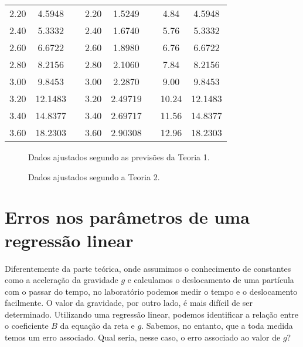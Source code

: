 \begin{table}
\begin{tabular}{cccccccc}
2.20    & 4.5948    &&  2.20    & 1.5249       &&   4.84     & 4.5948  \\
2.40    & 5.3332    &&  2.40    & 1.6740       &&   5.76     & 5.3332  \\
2.60    & 6.6722    &&  2.60    & 1.8980       &&   6.76     & 6.6722  \\
2.80    & 8.2156    &&  2.80    & 2.1060       &&   7.84     & 8.2156  \\
3.00    & 9.8453    &&  3.00    & 2.2870       &&   9.00     & 9.8453  \\
3.20    & 12.1483   &&  3.20    & 2.49719      &&   10.24    & 12.1483 \\
3.40    & 14.8377   &&  3.40    & 2.69717      &&   11.56    & 14.8377 \\
3.60    & 18.2303   &&  3.60    & 2.90308      &&   12.96    & 18.2303 \\
\bottomrule
\end{tabular}
\end{table}


\begin{figure*}
\centering
\forcerectofloat
\caption{Dados ajustados segundo as previsões da Teoria 1.}
\label{GraficoTeoria1}

\end{figure*}

\begin{figure*}
\centering
\caption{Dados ajustados segundo a Teoria 2.}
\label{GraficoTeoria2}

\end{figure*}


\section{Erros nos parâmetros de uma regressão linear}
\label{Chap:ErrosCoefAB}

Diferentemente da parte teórica, onde assumimos o conhecimento de constantes como a aceleração da gravidade $g$ e calculamos o deslocamento de uma partícula com o passar do tempo, no laboratório podemos medir o tempo e o deslocamento facilmente. O valor da gravidade, por outro lado, é mais difícil de ser determinado. Utilizando uma regressão linear, podemos identificar a relação entre o coeficiente $B$ da equação da reta e $g$. Sabemos, no entanto, que a toda medida temos um erro associado. Qual seria, nesse caso, o erro associado ao valor de $g$? 

